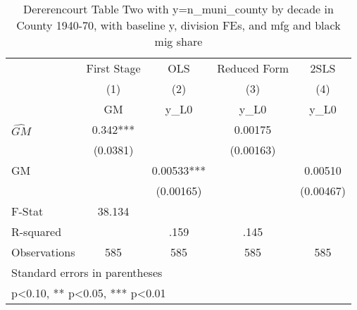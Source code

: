 \begin{table}[htbp]\centering
\def\sym#1{\ifmmode^{#1}\else\(^{#1}\)\fi}
\caption{Dererencourt Table Two with y=n\_muni\_county by decade in County 1940-70, with baseline y, division FEs, and mfg and black mig share}
\begin{tabular}{l*{4}{c}}
\toprule
                    & First Stage   &         OLS   &Reduced Form   &        2SLS   \\
                    &\multicolumn{1}{c}{(1)}&\multicolumn{1}{c}{(2)}&\multicolumn{1}{c}{(3)}&\multicolumn{1}{c}{(4)}\\
                    &\multicolumn{1}{c}{GM}&\multicolumn{1}{c}{y\_L0}&\multicolumn{1}{c}{y\_L0}&\multicolumn{1}{c}{y\_L0}\\
\midrule
$\hat{GM}$          &       0.342***&               &     0.00175   &               \\
                    &    (0.0381)   &               &   (0.00163)   &               \\
\addlinespace
GM                  &               &     0.00533***&               &     0.00510   \\
                    &               &   (0.00165)   &               &   (0.00467)   \\
\midrule
F-Stat              &      38.134   &               &               &               \\
R-squared           &               &        .159   &        .145   &               \\
Observations        &         585   &         585   &         585   &         585   \\
\bottomrule
\multicolumn{5}{l}{\footnotesize Standard errors in parentheses}\\
\multicolumn{5}{l}{\footnotesize * p<0.10, ** p<0.05, *** p<0.01}\\
\end{tabular}
\end{table}
